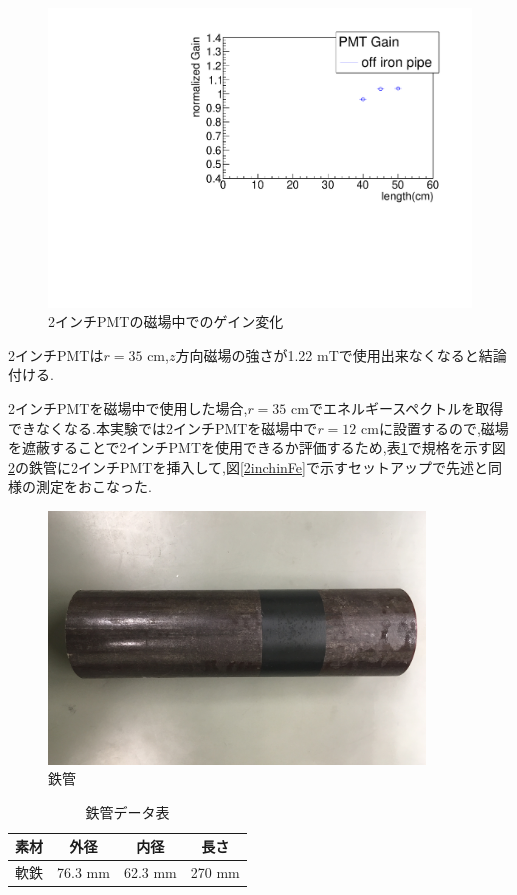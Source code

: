 \begin{figure}[tbp]
	\centering
		\includegraphics[angle=-90,width=15cm]{fig/iguchi/plot2inchPMT.pdf}
	\caption{2インチPMTの磁場中でのゲイン変化}
	\label{plot2inchoff}
\end{figure}
2インチPMTは$r=35$ cm,$z$方向磁場の強さが1.22 mTで使用出来なくなると結論付ける.

2インチPMTを磁場中で使用した場合,$r=35$ cmでエネルギースペクトルを取得できなくなる.本実験では2インチPMTを磁場中で$r=12$ cmに設置するので,磁場を遮蔽することで2インチPMTを使用できるか評価するため,表\ref{ironpipedata}で規格を示す図\ref{ironpipe}の鉄管に2インチPMTを挿入して,図\ref{2inchinFe}で示すセットアップで先述と同様の測定をおこなった.

\begin{figure}[tbp]
	\centering
		\includegraphics[width=10cm]{fig/iguchi/ironpipe.JPG}
	\caption{鉄管}
	\label{ironpipe}
\end{figure}

\begin{table}[tbp]
	\centering
	 \begin{tabular}{cccc} \hline
		素材 & 外径 & 内径 & 長さ \\ \hline \hline
		軟鉄 & 76.3 mm & 62.3 mm & 270 mm \\ \hline
	\end{tabular}
	  \caption{鉄管データ表}
	  \label{ironpipedata}
\end{table}

